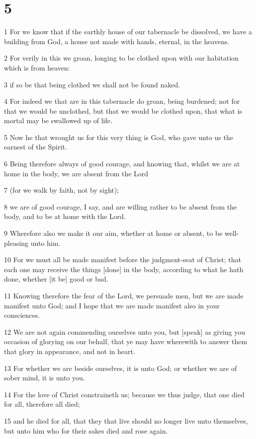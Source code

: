 \chapter{5}

\par 1 For we know that if the earthly house of our tabernacle be dissolved, we have a building from God, a house not made with hands, eternal, in the heavens.
\par 2 For verily in this we groan, longing to be clothed upon with our habitation which is from heaven:
\par 3 if so be that being clothed we shall not be found naked.
\par 4 For indeed we that are in this tabernacle do groan, being burdened; not for that we would be unclothed, but that we would be clothed upon, that what is mortal may be swallowed up of life.
\par 5 Now he that wrought us for this very thing is God, who gave unto us the earnest of the Spirit.
\par 6 Being therefore always of good courage, and knowing that, whilst we are at home in the body, we are absent from the Lord
\par 7 (for we walk by faith, not by sight);
\par 8 we are of good courage, I say, and are willing rather to be absent from the body, and to be at home with the Lord.
\par 9 Wherefore also we make it our aim, whether at home or absent, to be well-pleasing unto him.
\par 10 For we must all be made manifest before the judgment-seat of Christ; that each one may receive the things [done] in the body, according to what he hath done, whether [it be] good or bad.
\par 11 Knowing therefore the fear of the Lord, we persuade men, but we are made manifest unto God; and I hope that we are made manifest also in your consciences.
\par 12 We are not again commending ourselves unto you, but [speak] as giving you occasion of glorying on our behalf, that ye may have wherewith to answer them that glory in appearance, and not in heart.
\par 13 For whether we are beside ourselves, it is unto God; or whether we are of sober mind, it is unto you.
\par 14 For the love of Christ constraineth us; because we thus judge, that one died for all, therefore all died;
\par 15 and he died for all, that they that live should no longer live unto themselves, but unto him who for their sakes died and rose again.
